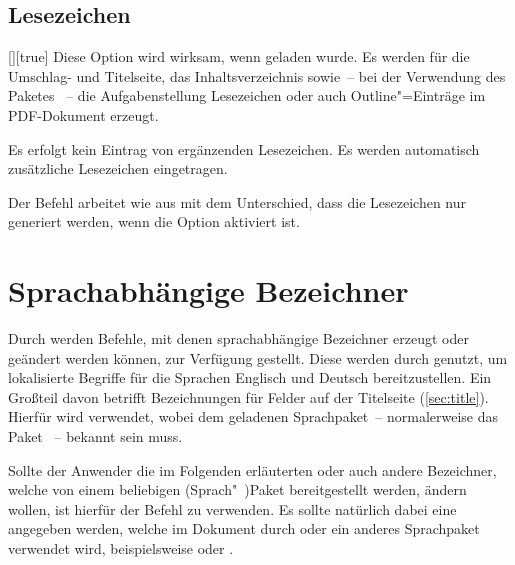 \subsection{Lesezeichen}
\begin{Declaration}{[\PBoolean]}[true]%
\printdeclarationlist%
%
%
%
%
Diese Option wird wirksam, wenn  geladen wurde. Es werden für 
die Umschlag- und Titelseite, das Inhaltsverzeichnis sowie~-- bei der 
Verwendung des Paketes ~-- die Aufgabenstellung 
Lesezeichen oder auch Outline"=Einträge im PDF-Dokument erzeugt.
%
\begin{values}
\itemfalse
  Es erfolgt kein Eintrag von ergänzenden Lesezeichen.
\itemtrue*
  Es werden automatisch zusätzliche Lesezeichen eingetragen.
\end{values}
\end{Declaration}

\begin{Declaration}{%
}%
\printdeclarationlist%
%
Der Befehl  arbeitet wie  aus 
 mit dem Unterschied, dass die Lesezeichen nur generiert 
werden, wenn die Option  aktiviert ist.
\end{Declaration}



\section{Sprachabhängige Bezeichner}
\label{sec:localization}
%
%
Durch \KOMAScript{} werden Befehle, mit denen sprachabhängige Bezeichner 
erzeugt oder geändert werden können, zur Verfügung gestellt. Diese werden durch 
\TUDScript genutzt, um lokalisierte Begriffe für die Sprachen Englisch und 
Deutsch bereitzustellen. Ein Großteil davon betrifft Bezeichnungen für Felder 
auf der Titelseite (\autoref{sec:title}). Hierfür wird
verwendet, wobei  dem geladenen Sprachpaket~-- normalerweise das 
Paket ~-- bekannt sein muss.

Sollte der Anwender die im Folgenden erläuterten oder auch andere Bezeichner, 
welche von einem beliebigen (Sprach"~)Paket bereitgestellt werden, ändern 
wollen, ist hierfür der Befehl
zu verwenden. Es sollte natürlich dabei eine  angegeben werden, 
welche im Dokument durch  oder ein anderes Sprachpaket verwendet 
wird, beispielsweise  oder . 


